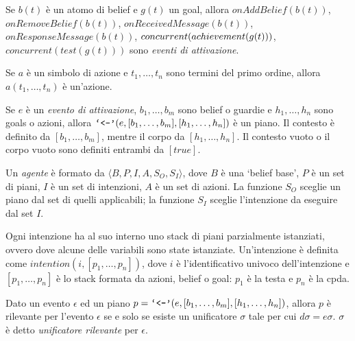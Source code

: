 \smallskip
\begin{defn}\label{defn:triggeringEvents}
Se $b(t)$ è un atomo di belief e $g(t)$ un goal, allora $onAddBelief(b(t))$, $onRemoveBelief(b(t))$, $onReceivedMessage(b(t))$, $onResponseMessage(b(t))$,  $con\-cur\-rent(achieve\-ment(g(t)))$, $concurrent(test(g(t)))$ sono \textit{eventi di attivazione}.
\end{defn}

\smallskip
\begin{defn}
Se $a$ è un simbolo di azione e $t_1, \ldots, t_n$ sono termini del primo ordine, allora $a(t_1, \ldots, t_n)$ è un'azione.
\end{defn}

\smallskip
\begin{defn}
Se $e$ è un \textit{evento di attivazione}, $b_1, \ldots, b_m$ sono belief o guardie e $h_1, \ldots, h_n$ sono goals o azioni, allora $\text{\text{\texttt{`<-'}}}(e, [b_1, \ldots, b_m], [h_1, \ldots, h_n])$ è un piano.
Il contesto è definito da $[b_1, \ldots, b_m]$, mentre il corpo da $[h_1, \ldots, h_n]$. Il contesto vuoto o il corpo vuoto sono definiti entrambi da $[true]$.
\end{defn}

\smallskip
\begin{defn}
Un \textit{agente} è formato da $\langle B,P,I,A,S_O,S_I \rangle$, dove $B$ è una `belief base', $P$ è un set di piani, $I$ è un set di intenzioni, $A$ è un set di azioni. La funzione $S_O$ sceglie un piano dal set di quelli applicabili; la funzione $S_I$ sceglie l'intenzione da eseguire dal set $I$.
\end{defn}

\smallskip
\begin{defn}\label{defn:intenzione}
Ogni intenzione ha al suo interno uno stack di piani parzialmente istanziati, ovvero dove alcune delle variabili sono state istanziate. Un'intenzione è definita come $intention(i, [p_1, \ldots, p_n])$, dove $i$ è l'identificativo univoco dell'intenzione e $[p_1, \ldots,p_n]$ è lo stack formata da azioni, belief o goal: $p_1$ è la testa e $p_n$ è la cpda.
\end{defn}

\smallskip
\begin{defn}
Dato un evento $\epsilon$ ed un piano $p = \text{\text{\texttt{`<-'}}}(e, [b_1, \ldots, b_m], [h_1, \ldots, h_n])$, allora $p$ è rilevante per l'evento $\epsilon$ se e solo se esiste un unificatore $\sigma$ tale per cui $d\sigma = e\sigma$. $\sigma$ è detto \textit{unificatore rilevante} per $\epsilon$.
\end{defn}

